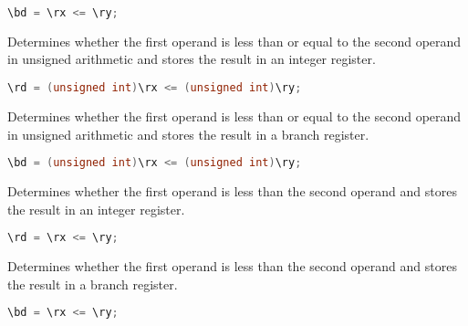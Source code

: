 \begin{lstlisting}[numbers=none, basicstyle=\ttfamily\footnotesize, language=C++]
\bd = \rx <= \ry;
\end{lstlisting}

Determines whether the first operand is less than or equal to the second
operand in unsigned arithmetic and stores the result in an integer register.

\begin{lstlisting}[numbers=none, basicstyle=\ttfamily\footnotesize, language=C++]
\rd = (unsigned int)\rx <= (unsigned int)\ry;
\end{lstlisting}

Determines whether the first operand is less than or equal to the second
operand in unsigned arithmetic and stores the result in a branch register.

\begin{lstlisting}[numbers=none, basicstyle=\ttfamily\footnotesize, language=C++]
\bd = (unsigned int)\rx <= (unsigned int)\ry;
\end{lstlisting}

Determines whether the first operand is less than the second operand and stores
the result in an integer register.

\begin{lstlisting}[numbers=none, basicstyle=\ttfamily\footnotesize, language=C++]
\rd = \rx <= \ry;
\end{lstlisting}

Determines whether the first operand is less than the second operand and stores
the result in a branch register.

\begin{lstlisting}[numbers=none, basicstyle=\ttfamily\footnotesize, language=C++]
\bd = \rx <= \ry;
\end{lstlisting}

